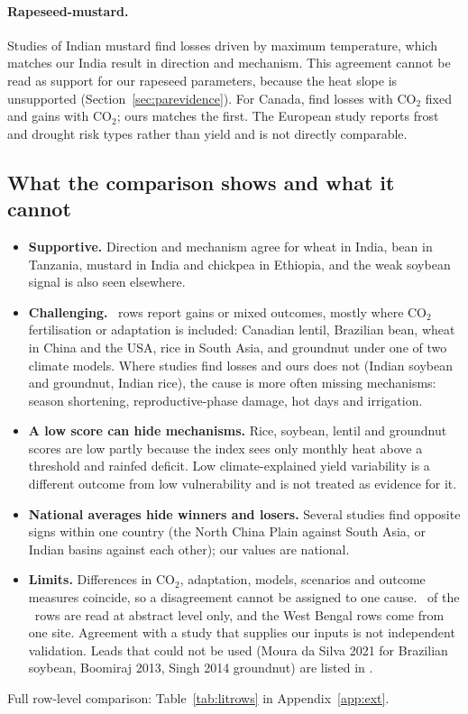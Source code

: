 \paragraph{Rapeseed-mustard.} Studies of Indian mustard \citep{nareshkumar2016mustard,boomiraj2010} find losses driven
by maximum temperature, which matches our India result in direction and mechanism. This agreement cannot be read as
support for our rapeseed parameters, because the heat slope is unsupported (Section~\ref{sec:parevidence}). For Canada,
\citet{qian2019} find losses with CO$_2$ fixed and gains with CO$_2$; ours matches the first. The European study
\citep{pullens2019} reports frost and drought risk types rather than yield and is not directly comparable.

\subsection{What the comparison shows and what it cannot}
\begin{itemize}
\item \textbf{Supportive.} Direction and mechanism agree for wheat in India, bean in Tanzania, mustard in India and
chickpea in Ethiopia, and the weak soybean signal is also seen elsewhere.
\item \textbf{Challenging.} \litNChallenge\ rows report gains or mixed outcomes, mostly where CO$_2$ fertilisation or
adaptation is included: Canadian lentil, Brazilian bean, wheat in China and the USA, rice in South Asia, and
groundnut under one of two climate models. Where studies find losses and ours does not (Indian soybean and groundnut,
Indian rice), the cause is more often missing mechanisms: season shortening, reproductive-phase damage, hot days and
irrigation.
\item \textbf{A low score can hide mechanisms.} Rice, soybean, lentil and groundnut scores are low partly because the
index sees only monthly heat above a threshold and rainfed deficit. Low climate-explained yield variability
\citep{ray2015} is a different outcome from low vulnerability and is not treated as evidence for it.
\item \textbf{National averages hide winners and losers.} Several studies find opposite signs within one country
(the North China Plain against South Asia, or Indian basins against each other); our values are national.
\item \textbf{Limits.} Differences in CO$_2$, adaptation, models, scenarios and outcome measures coincide, so a
disagreement cannot be assigned to one cause. \litNAbstract\ of the \litNRows\ rows are read at abstract level only,
and the West Bengal rows come from one site. Agreement with a study that supplies our inputs is not independent validation. Leads that could not be used
(Moura da Silva 2021 for Brazilian soybean, Boomiraj 2013, Singh 2014 groundnut) are listed in
.
\end{itemize}
Full row-level comparison: Table~\ref{tab:litrows} in Appendix~\ref{app:ext}.
